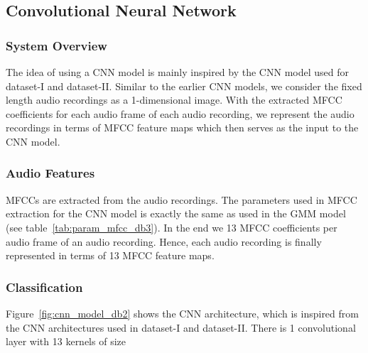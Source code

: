 \subsection{Convolutional Neural Network}

\subsubsection{System Overview}
The idea of using a CNN model is mainly inspired by the CNN model used for dataset-I and dataset-II. Similar to the earlier CNN models, we consider the fixed length audio recordings as a 1-dimensional image. With the extracted MFCC coefficients for each audio frame of each audio recording, we represent the audio recordings in terms of MFCC feature maps which then serves as the input to the CNN model.

\subsubsection{Audio Features}
MFCCs are extracted from the audio recordings. The parameters used in MFCC extraction for the CNN model is exactly the same as used in the GMM model (see table~\ref{tab:param_mfcc_db3}). In the end we 13 MFCC coefficients per audio frame of an audio recording. Hence, each audio recording is finally represented in terms of 13 MFCC feature maps.

\subsubsection{Classification}

Figure~\ref{fig:cnn_model_db2} shows the CNN architecture, which is inspired from the CNN architectures used in dataset-I and dataset-II. There is 1 convolutional layer with 13 kernels of size